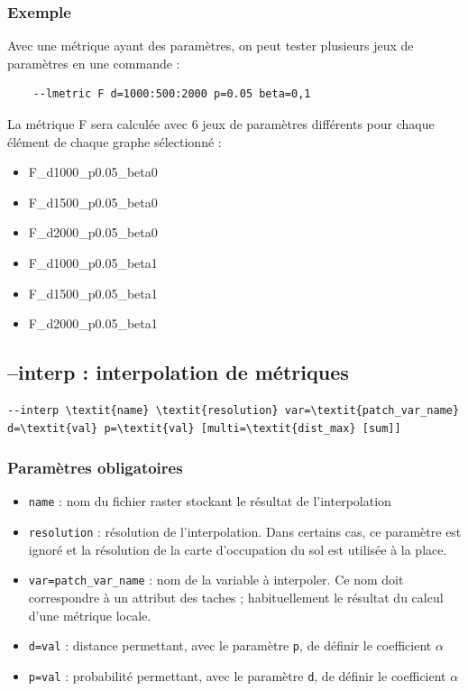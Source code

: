 \documentclass[a4paper,10pt]{report}
\begin{document}
\subsubsection{Exemple}
Avec une métrique ayant des paramètres, on peut tester plusieurs jeux de paramètres en une commande :
\begin{Verbatim}
	--lmetric F d=1000:500:2000 p=0.05 beta=0,1
\end{Verbatim}
La métrique F sera calculée avec 6 jeux de paramètres différents pour chaque élément de chaque graphe sélectionné :
\begin{itemize}
 \item F\_d1000\_p0.05\_beta0
 \item F\_d1500\_p0.05\_beta0
 \item F\_d2000\_p0.05\_beta0
 \item F\_d1000\_p0.05\_beta1
 \item F\_d1500\_p0.05\_beta1
 \item F\_d2000\_p0.05\_beta1
\end{itemize}

\subsection{--interp : interpolation de métriques}
\begin{Verbatim}[commandchars=\\\{\}]
--interp \textit{name} \textit{resolution} var=\textit{patch_var_name} d=\textit{val} p=\textit{val} [multi=\textit{dist_max} [sum]]
\end{Verbatim}

\subsubsection{Paramètres obligatoires}
\begin{itemize}
	\item \verb|name| : nom du fichier raster stockant le résultat de l'interpolation
	\item \verb|resolution| : résolution de l'interpolation. Dans certains cas, ce paramètre est ignoré et la résolution de la carte d'occupation du sol est utilisée à la place.
	\item \verb|var=patch_var_name| : nom de la variable à interpoler. Ce nom doit correspondre à un attribut des taches ; habituellement le résultat du calcul d'une métrique locale.
	\item \verb|d=val| : distance permettant, avec le paramètre \verb|p|, de définir le coefficient $\alpha$ 
	\item \verb|p=val| : probabilité permettant, avec le paramètre \verb|d|, de définir le coefficient $\alpha$ 
\end{itemize}
\end{document}
